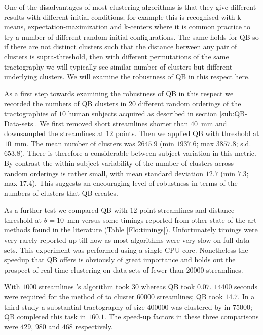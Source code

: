 \documentclass{bioinfo}
\begin{document}
One of the disadvantages of most clustering algorithms is that they give
different results with different initial conditions; for example this is
recognised with k-means, expectation-maximization
\citep{dempster1977maximum} and k-centers \citep{gonzalez1985clustering}
where it is common practice to try a number of different random initial
configurations. The same holds for QB so if there are not distinct
clusters such that the distance between any pair of clusters is
supra-threshold, then with different permutations of the same
tractography we will typically see similar number of clusters but
different underlying clusters. We will examine the robustness of QB in
this respect here.

As a first step towards examining the robustness of QB in this respect
we recorded the numbers of QB clusters in $20$ different random
orderings of the tractographies of $10$ human subjects acquired as
described in section \ref{sub:QB-Data-sets}. We first removed short
streamlines shorter than $40$~mm and downsampled the streamlines at $12$
points. Then we applied QB with threshold at $10$~mm. The mean number of
clusters was $2645.9$ (min $1937.6$; max $3857.8$; s.d.~$653.8$). There
is therefore a considerable between-subject variation in this metric. By
contrast the within-subject variability of the number of clusters across
random orderings is rather small, with mean standard deviation $12.7$
(min $7.3$; max $17.4$). This suggests an encouraging level of
robustness in terms of the numbers of clusters that QB creates.

As a further test we compared QB with $12$ point streamlines and
distance threshold at $\theta=10$~mm versus some timings reported from
other state of the art methods found in the literature (Table
\ref{Flo:timings}). Unfortunately timings were very rarely reported up
till now as most algorithms were very slow on full data sets. This
experiment was performed using a single CPU core. Nonetheless the
speedup that QB offers is obviously of great importance and holds out
the prospect of real-time clustering on data sets of fewer than
\num{20000} streamlines. 

With $\num{1000}$ streamlines \citet{wang2010tractography}'s algorithm
took $30$ whereas QB took $0.07$.  $\num{14400}$ seconds were required
for the method of \citet{wang2010tractography} to cluster $\num{60000}$
streamlines; QB took $14.7$.  In a third study a substantial
tractography of size $\num{400000}$ was clustered by \citet{Visser2010}
in $\num{75000}$; QB completed this task in $160.1$. The speed-up
factors in these three comparisons were $429$, $980$ and $468$
respectively.
\end{document}
